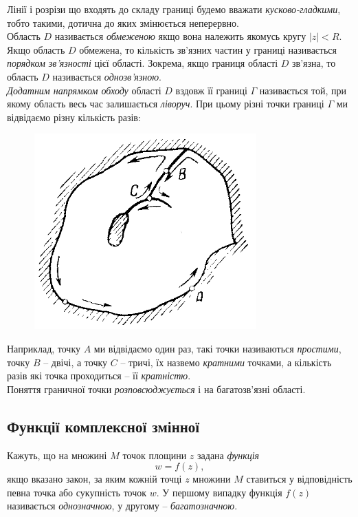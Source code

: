 Лінії і розрізи що входять до складу границі будемо вважати \textit{кусково-гладкими}, тобто такими, дотична до яких змінюється неперервно. \\

Область $D$ називається \textit{обмеженою} якщо вона належить якомусь кругу $|z| < R$. Якщо область $D$ обмежена, то кількість зв'язних частин у границі називається \textit{порядком зв'язності} цієї області. Зокрема, якщо границя області $D$ зв'язна, то область $D$ називається \textit{однозв'язною}. \\

\textit{Додатним напрямком обходу} області $D$ вздовж її границі $\Gamma$ називається той, при якому область весь час залишається \textit{ліворуч}. При цьому різні точки границі $\Gamma$ ми відвідаємо різну кількість разів:
\begin{figure}[H]
	\centering
	\includegraphics[width=.4\linewidth]{mal-06.png}
	\label{fig:2.2}
\end{figure}
Наприклад, точку $A$ ми відвідаємо один раз, такі точки називаються \textit{простими}, точку $B$ -- двічі, а точку $C$ -- тричі, їх назвемо \textit{кратними} точками, а кількість разів які точка проходиться -- її \textit{кратністю}. \\

Поняття граничної точки \textit{розповсюджується} і на багатозв'язні області.

\subsection{Функції комплексної змінної}

Кажуть, що на множині $M$ точок площини $z$ задана \textit{функція}
\begin{equation}
	\label{eq:2.1.1}
	w = f(z),
\end{equation}
якщо вказано закон, за яким кожній точці $z$ множини $M$ ставиться у відповідність певна точка або сукупність точок $w$. У першому випадку функція $f(z)$ називається \textit{однозначною}, у другому -- \textit{багатозначною}. \\

